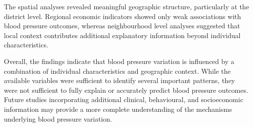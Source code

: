 \documentclass[12pt,a4paper]{article}
\begin{document}
The spatial analyses revealed meaningful geographic structure, particularly at the district level. Regional economic indicators showed only weak associations with blood pressure outcomes, whereas neighbourhood level analyses suggested that local context contributes additional explanatory information beyond individual characteristics.

Overall, the findings indicate that blood pressure variation is influenced by a combination of individual characteristics and geographic context. While the available variables were sufficient to identify several important patterns, they were not sufficient to fully explain or accurately predict blood pressure outcomes. Future studies incorporating additional clinical, behavioural, and socioeconomic information may provide a more complete understanding of the mechanisms underlying blood pressure variation.
\end{document}
